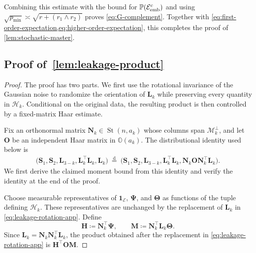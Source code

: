 \documentclass[11pt]{article}
\newcommand{\Pp}{\mathbb{P}}
\newcommand{\ind}{\bm{1}}
\newcommand{\trans}{\top}
\DeclareMathOperator{\St}{St}
\newcommand{\cM}{\mathcal{M}}
\newcommand{\cE}{\mathcal{E}}
\newcommand{\Hc}{\mathcal{H}}
\begin{document}
Combining this estimate with the bound for $\Pp(\cE_{\rm emb}^c)$ and using
$\sqrt{p_{\min}}\asymp\sqrt{r+ (r_1\wedge r_2)}$ proves
\cref{eq:G-complement}. Together with
\cref{eq:first-order-expectation,eq:higher-order-expectation}, this
completes the proof of \cref{lem:stochastic-master}.

\subsection{Proof of~\cref{lem:leakage-product}}
\label{app:proof-leakage-product}

\begin{proof}
The proof has two parts. We first use the rotational invariance of the
Gaussian noise to randomize the orientation of \(\bm L_k\) while preserving
every quantity in \(\Hc_k\). Conditional on the original data, the resulting
product is then controlled by a fixed-matrix Haar estimate.

Fix an orthonormal matrix
\(\bm N_k\in\St(n,a_k)\) whose columns span \(\cM_k^\perp\), and let
\(\bm O\) be an independent Haar matrix in \(\mathbb O(a_k)\). The
distributional identity used below is
\begin{equation}
\label{eq:leakage-rotation-app}
\begin{aligned}
  \bigl(
    \bm S_1,\bm S_2,\bm L_{3-k},
    \bm L_k^\trans\bm L_k,\bm L_k
  \bigr)
  \ \overset{\mathrm d}{=}\
  \bigl(
    \bm S_1,\bm S_2,\bm L_{3-k},
    \bm L_k^\trans\bm L_k,
    \bm N_k\bm O\bm N_k^\trans\bm L_k
  \bigr).
\end{aligned}
\end{equation}
We first derive the claimed moment bound from this identity and verify the
identity at the end of the proof.

Choose measurable representatives of
\(\ind_{\cE}\), \(\bm\Psi\), and \(\bm\Theta\) as functions of the tuple
defining \(\Hc_k\). These representatives are unchanged by the replacement
of \(\bm L_k\) in \cref{eq:leakage-rotation-app}. Define
\[
  \bm H\coloneqq\bm N_k^\trans\bm\Psi,
  \qquad
  \bm M\coloneqq\bm N_k^\trans\bm L_k\bm\Theta.
\]
Since \(\bm L_k=\bm N_k\bm N_k^\trans\bm L_k\), the product obtained after
the replacement in \cref{eq:leakage-rotation-app} is
\(\bm H^\trans\bm O\bm M\).


\end{proof}
\end{document}
